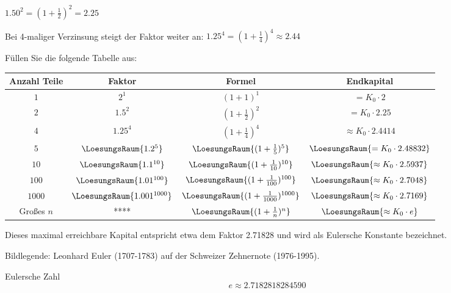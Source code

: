 $1.50^2  = (1 + \frac12)^2 = 2.25$

Bei 4-maliger Verzinsung steigt der Faktor weiter an:
$1.25^4 = (1 + \frac14)^4 \approx 2.44 $

Füllen Sie die folgende Tabelle aus:

\begin{tabular}{c|c|c|c} 
  Anzahl Teile  & Faktor                        & Formel          & Endkapital \\ \hline
  $1$           & $2^1$                         & $(1+1)^1$ & $= K_0 \cdot{} 2 $ \\ \hline
  $2$           & $1.5^2$                       & $(1+\frac12)^2$ & $= K_0 \cdot{} 2.25 $ \\ \hline
  $4$           & $1.25^4$                      & $(1+\frac14)^4$ & $\approx K_0 \cdot{} 2.4414 $ \\ \hline
  $5$           & $\LoesungsRaum{1.2^5}$         & $\LoesungsRaum{(1+\frac15)^5}$ & $\LoesungsRaum{= K_0 \cdot{} 2.48832} $ \\ \hline
  $10$          & $\LoesungsRaum{1.1^{10}}$      & $\LoesungsRaum{(1+\frac{1}{10})^{10}}$ & $\LoesungsRaum{\approx K_0 \cdot{} 2.5937} $ \\ \hline
  $100$         & $\LoesungsRaum{1.01^{100}}$    & $\LoesungsRaum{(1+\frac{1}{100})^{100}}$ & $\LoesungsRaum{\approx K_0 \cdot{} 2.7048 }$ \\ \hline
  $1000$        & $\LoesungsRaum{1.001^{1000}}$  & $\LoesungsRaum{(1+\frac{1}{1000})^{1000}}$ & $\LoesungsRaum{\approx K_0 \cdot{} 2.7169 }$ \\ \hline
  Großes $n$    & ****  & $\LoesungsRaum{(1+\frac{1}{n})^{n}}$ & $\LoesungsRaum{\approx K_0 \cdot{} e }$ \\ \hline
\end{tabular} 

Dieses maximal erreichbare Kapital entspricht etwa dem Faktor 2.71828 und
wird als Eulersche Konstante bezeichnet.

Bildlegende: Leonhard Euler (1707-1783) auf der Schweizer Zehnernote (1976-1995).

\begin{definition}{Eulersche Zahl}{}
$$e \approx 2.7182818284590$$
\end{definition}
\newpage
